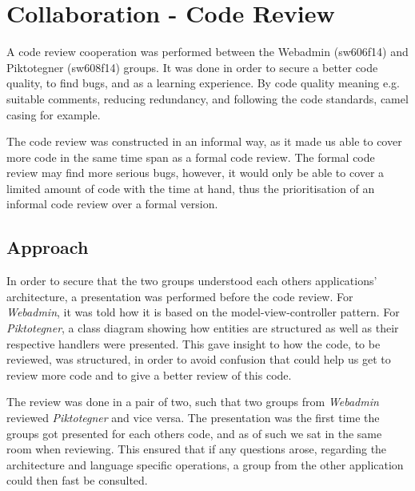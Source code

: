 \chapter{Collaboration - Code Review}
A code review cooperation was performed between the Webadmin (sw606f14) and Piktotegner (sw608f14) groups.
It was done in order to secure a better code quality, to find bugs, and as a learning experience.
By code quality meaning e.g. suitable comments, reducing redundancy, and following the code standards, camel casing for example.

The code review was constructed in an informal way, as it made us able to cover more code in the same time span as a formal code review.
The formal code review may find more serious bugs, however, it would only be able to cover a limited amount of code with the time at hand, thus the prioritisation of an informal code review over a formal version.


\section*{Approach}
In order to secure that the two groups understood each others applications' architecture, a presentation was performed before the code review. 
For \textit{Webadmin}, it was told how it is based on the model-view-controller pattern.
For \textit{Piktotegner}, a class diagram showing how entities are structured as well as their respective handlers were presented.
This gave insight to how the code, to be reviewed, was structured, in order to avoid confusion that could help us get to review more code and to give a better review of this code.

The review was done in a pair of two, such that two groups from \textit{Webadmin} reviewed \textit{Piktotegner} and vice versa.
The presentation was the first time the groups got presented for each others code, and as of such we sat in the same room when reviewing.
This ensured that if any questions arose, regarding the architecture and language specific operations, a group from the other application could then fast be consulted.

